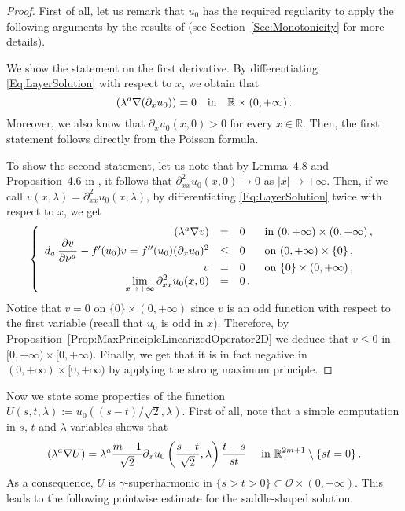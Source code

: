 \documentclass[12pt,reqno]{amsart}
\theoremstyle{definition}
\theoremstyle{remark}
\newcommand{\con}[1]{\mathbb{#1}}
\newcommand{\R}{\con{R}} %
\newcommand{\ocal}{\mathcal{O}}
\newcommand{\s}{\gamma}
\newcommand{\bpar}[1]{\left ( {#1}\right )}
\newcommand\beqc[1]{\left\{\begin{array}{#1}}
\newcommand\eeqc{\end{array} \right.}
\def\PDEsystem{rcll}
\let\div\relax
\DeclareMathOperator{\div}{div}
\def\ds{\displaystyle}
\numberwithin{equation}{section}
\begin{document}
\begin{proof}
First of all, let us remark that $u_0$ has the required regularity to apply the following arguments by the results of \cite{CabreSireI} (see Section~\ref{Sec:Monotonicity} for more details).


We show the statement on the first derivative. By differentiating \eqref{Eq:LayerSolution} with respect to $x$, we obtain that 
$$\div(\lambda^a \nabla (\partial_x u_0)) = 0\ \ \ \text{in} \ \ \ \R\times (0,+\infty)\,.$$ 
Moreover, we also know that $\partial_x u_0(x,0) > 0$ for every $x\in \R$. Then, the first statement follows directly from the Poisson formula.

To show the second statement, let us note that by Lemma~4.8 and Proposition~4.6 in \cite{CabreSireI}, it follows that $\partial^2_{xx} u_0(x,0) \to 0$ as $|x|\to +\infty$.
Then, if we call $v(x,\lambda) = \partial^2_{xx} u_0(x,\lambda)$, by differentiating \eqref{Eq:LayerSolution} twice with respect to $x$, we get
\begin{equation*}
\beqc{\PDEsystem}
\div(\lambda^a \nabla v) &=& 0 & \text{ in } (0,+\infty)\times (0,+\infty) \,, \\
d_a\,\dfrac{\partial v}{\partial \nu^a} - f'(u_0) v = f''(u_0) (\partial_x u_0) ^2 &\leq & 0 & \text{ on } (0,+\infty) \times \{0\} \,, \\
v & = & 0 & \text{ on } \{0\} \times (0,+\infty) \,, \\
\ds \lim_{x\to +\infty} \partial^2_{xx} u_0(x,0)  &= &0\,.
\eeqc
\end{equation*}
Notice that $v = 0$ on $\{0\} \times (0,+\infty)$ since $v$ is an odd function with respect to the first variable (recall that $u_0$ is odd in $x$). Therefore, by Proposition~\ref{Prop:MaxPrincipleLinearizedOperator2D} we deduce that $v\leq 0$ in $[0,+\infty)\times [0,+\infty)$. Finally, we get that it is in fact negative in $(0,+\infty)\times [0,+\infty)$ by applying the strong maximum principle.
\end{proof}

Now we state some properties of the function $U(s,t,\lambda) := u_0 ( (s-t)/\sqrt{2}, \lambda)$. First of all, note that a simple computation in $s$, $t$ and $\lambda$ variables shows that
\begin{equation}
\label{Eq:EqForULayer}
\div (\lambda^a \nabla U) = \lambda^a \dfrac{m-1}{\sqrt{2}} \partial_x u_0 \bpar{\dfrac{s-t}{\sqrt{2}}, \lambda} \dfrac{t-s}{st} \quad \text{ in } \R^{2m + 1}_+ \setminus \{st=0\}\,.
\end{equation}
As a consequence, $U$ is $\s$-superharmonic in $\{s>t>0\} \subset \ocal \times (0, +\infty)$. This leads to the following pointwise estimate for the saddle-shaped solution.
\end{document}
